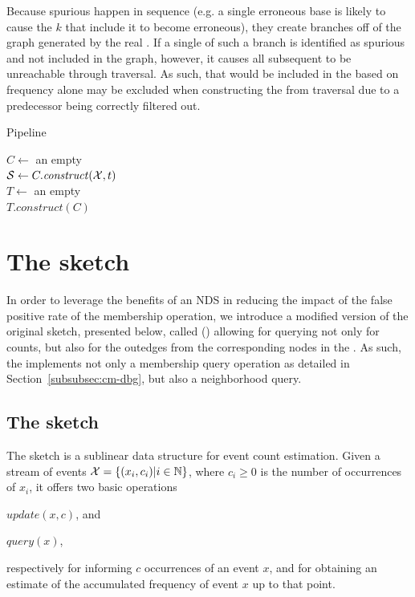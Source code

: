 Because spurious  happen in sequence (e.g. a single erroneous base is likely to cause the $k$  that include it to become erroneous), they create branches off of the graph generated by the real . If a single \kmer of such a branch is identified as spurious and not included in the graph, however, it causes all subsequent  to be unreachable through traversal. As such,  that would be included in the \dBG based on frequency alone may be excluded when constructing the \dBHT from traversal due to a predecessor being correctly filtered out.

\begin{algorithm}
  \caption{Pipeline}\label{alg:pipeline}
  $C \gets$ an empty \dBCM\\
  $\strsetname{S} \gets C.\mathit{construct}(\readset, t)$\\
  $T \gets$ an empty \dBHT\\
  $T.\mathit{construct}(C)$\\
\end{algorithm}


\section{The \dB\cm sketch}
\label{sec:debruijncountmin}

In order to leverage the benefits of an NDS in reducing the impact of the false positive rate of the membership operation, we introduce a modified version of the original \cm sketch, presented below, called \keyterm{\dB\cm} (\dBCM) allowing for querying not only for \kmer counts, but also for the outedges from the corresponding nodes in the \dBG. As such, the \dBCM implements not only a membership query operation as detailed in Section~\ref{subsubsec:cm-dbg}, but also a neighborhood query.



\subsection{The \cm sketch}
\label{sec:countmin}

The \cm sketch \cite{Cormode2005} is a sublinear data structure for event count estimation. Given a stream of events $\strsetname{X} = \{(x_i, c_i) | i \in \mathbb{N}\}$, where $c_i \geq 0$ is the number of occurrences of $x_i$, it offers two basic operations
\begin{compactenum}
\item $update(x, c)$, and
\item $query(x)$,
\end{compactenum}
respectively for informing $c$ occurrences of an event $x$, and for obtaining an estimate of the accumulated frequency of event $x$ up to that point.

